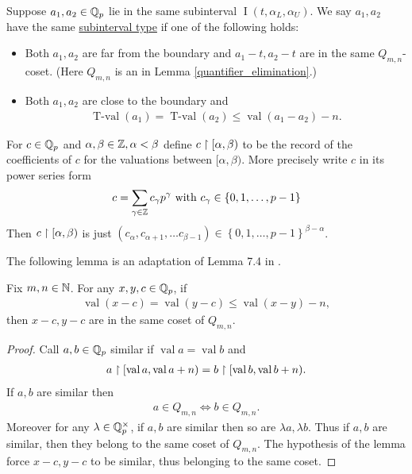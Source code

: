 \documentclass{amsart}
\newcommand{\curly}[1]{\left\{#1\right\}}
\DeclareMathOperator{\val}{val}
\DeclareMathOperator{\vval}{val}
\DeclareMathOperator{\tval}{T-val}
\DeclareMathOperator{\inti}{I}
\newcommand{\defn}{\underline}
\newcommand{\interval}{\inti(t, \alpha_L, \alpha_U)}
\begin{document}
\begin{Definition}
  Suppose $a_1, a_2 \in \mathbb{Q}_p$ lie in the same subinterval $\interval$.
  We say $a_1, a_2$ have the same \defn{subinterval type} if one of the following holds:
  \begin{itemize}
  \item Both $a_1, a_2$ are far from the boundary and $a_1 - t, a_2 - t$ are in the same $Q_{m,n}$-coset.
    (Here $Q_{m,n}$ is an in Lemma \ref{quantifier_elimination}.)
  \item Both $a_1, a_2$ are close to the boundary and 
    \begin{align*}
	  \tval(a_1) = \tval(a_2) \leq \vval(a_1 - a_2) - n.
    \end{align*}
  \end{itemize}      
\end{Definition}


\begin{Definition}
	For $c \in \mathbb{Q}_p$ and $\alpha, \beta \in \mathbb{Z}, \alpha < \beta$ define $c \upharpoonright [\alpha, \beta)$
  to be the record of the coefficients of $c$ for the valuations between $[\alpha, \beta)$.
  More precisely write $c$ in its power series form
  \begin{align*}
    c = \sum_{\gamma \in \Z} c_\gamma p^\gamma \text{ with } c_\gamma \in \curly{0,1, \ldots, p-1}
  \end{align*}
  Then $c \upharpoonright [\alpha, \beta)$ is just $(c_\alpha, c_{\alpha+1}, \ldots c_{\beta - 1}) \in \curly{0,1, \ldots, p-1}^{\beta - \alpha}$.
\end{Definition}

The following lemma is an adaptation of Lemma 7.4 in \cite{density}.
\begin{Lemma} \label{distance}
  Fix $m,n \in \mathbb{N}$.
  For any $x,y,c \in \mathbb{Q}_p$, if
  \begin{align*}
    \val (x - c) = \val (y - c) \leq \val (x - y) - n,
  \end{align*}
  then $x - c, y - c$ are in the same coset of $Q_{m,n}$.
\end{Lemma}
\begin{proof}
  Call $a,b \in \mathbb{Q}_p$ similar if $\val a = \val b$ and
  \begin{align*}
    a \midr [\val a, \val a + n) = b \midr [\val b, \val b + n).
  \end{align*}
  If $a,b$ are similar then
  \begin{align*}
    a \in Q_{m,n} \iff b \in Q_{m,n}.
  \end{align*}
  Moreover for any $\lambda \in \mathbb{Q}_p^\times$, if $a,b$ are similar then so are $\lambda a, \lambda b$.
  Thus if $a,b$ are similar, then they belong to the same coset of $Q_{m,n}$.
  The hypothesis of the lemma force $x - c, y - c$ to be similar, thus belonging to the same coset.
\end{proof} 
\end{document}
